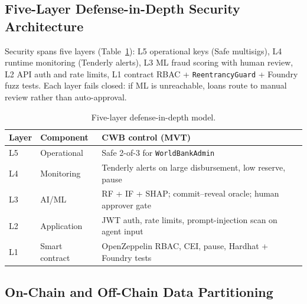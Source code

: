 \documentclass[12pt,a4paper]{article}
\newcommand{\tableheadcolor}{\rowcolor{TableHeadBg}}
\begin{document}
\subsection{Five-Layer Defense-in-Depth Security Architecture}
\label{sec:defense-in-depth}

Security spans five layers (Table~\ref{tab:defense-layers}): L5 operational keys (Safe multisigs), L4 runtime monitoring (Tenderly alerts), L3 ML fraud scoring with human review, L2 API auth and rate limits, L1 contract RBAC + \texttt{ReentrancyGuard} + Foundry fuzz tests. Each layer fails closed: if ML is unreachable, loans route to manual review rather than auto-approval.

\begin{table}[H]
\centering
\caption[Five-layer defense-in-depth model]{Five-layer defense-in-depth model.}
\label{tab:defense-layers}
\small
\begin{tabular}{@{}p{1.2cm}p{3.2cm}p{10.0cm}@{}}
\toprule
\tableheadcolor
\textbf{Layer} & \textbf{Component} & \textbf{CWB control (MVT)} \\
\midrule
L5 & Operational & Safe 2-of-3 for \texttt{WorldBankAdmin} \\
L4 & Monitoring & Tenderly alerts on large disbursement, low reserve, pause \\
L3 & AI/ML & RF + IF + SHAP; commit--reveal oracle; human approver gate \\
L2 & Application & JWT auth, rate limits, prompt-injection scan on agent input \\
L1 & Smart contract & OpenZeppelin RBAC, CEI, pause, Hardhat + Foundry tests \\
\bottomrule
\end{tabular}
\end{table}

\subsection{On-Chain and Off-Chain Data Partitioning}
\label{sec:data-partitioning}
\end{document}
